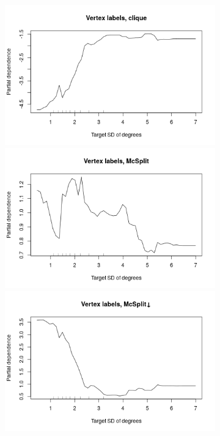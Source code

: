 \documentclass{l4proj}
\theoremstyle{definition}
\theoremstyle{remark}
\begin{document}
\begin{figure}
  \centering
  \begin{subfigure}[t]{0.49\textwidth}
    \centering
    \includegraphics[width=\textwidth]{images/vertex_labels_clique_stddeg.png}
    \includegraphics[width=\textwidth]{images/vertex_labels_mcsplit_stddeg.png}
    \includegraphics[width=\textwidth]{images/vertex_labels_mcsplitdown_stddeg.png}

\end{subfigure}
\end{figure}
\end{document}
